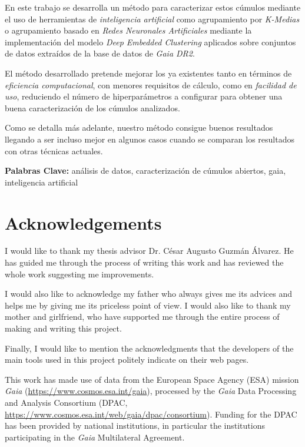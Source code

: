 \documentclass[11pt, a4paper, english]{book}
\begin{document}
En este trabajo se desarrolla un método para caracterizar estos cúmulos mediante el uso de herramientas de \emph{inteligencia artificial}
como agrupamiento por \emph{K-Medias} o agrupamiento basado en \emph{Redes Neuronales Artificiales} mediante la implementación del
modelo \emph{Deep Embedded Clustering} aplicados sobre conjuntos de datos extraídos de la base de datos de \emph{Gaia DR2}.

El método desarrollado pretende mejorar los ya existentes tanto en términos de \emph{eficiencia computacional}, con menores requisitos de cálculo,
como en \emph{facilidad de uso}, reduciendo el número de hiperparámetros a configurar para obtener una buena caracterización de los cúmulos analizados.

Como se detalla más adelante, nuestro método consigue buenos resultados llegando a ser incluso mejor en algunos casos cuando se comparan
los resultados con otras técnicas actuales.

\medskip

{\bf Palabras Clave:} análisis de datos, caracterización de cúmulos abiertos, gaia, inteligencia artificial

\chapter{Acknowledgements}

I would like to thank my thesis advisor Dr. César Augusto Guzmán Álvarez.
He has guided me through the process of writing this work and has reviewed
the whole work suggesting me improvements.

I would also like to acknowledge my father who always gives me its advices and
helps me by giving me its priceless point of view. I would also like to thank
my mother and girlfriend, who have supported me through the entire process
of making and writing this project.

Finally, I would like to mention the acknowledgments that the developers
of the main tools used in this project politely indicate on their web pages.

\medskip

This work has made use of data from the European Space Agency (ESA) mission
{\it Gaia} (\url{https://www.cosmos.esa.int/gaia}), processed by the {\it Gaia}
Data Processing and Analysis Consortium (DPAC,
\url{https://www.cosmos.esa.int/web/gaia/dpac/consortium}). Funding for the DPAC
has been provided by national institutions, in particular the institutions
participating in the {\it Gaia} Multilateral Agreement.
\end{document}
